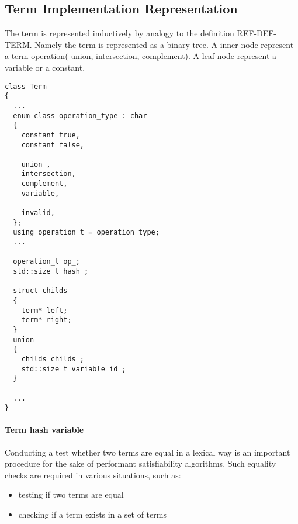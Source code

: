 \documentclass{article}
\begin{document}
	\subsection*{Term Implementation Representation}
	\label{sec:term-implementation-representation}
		The term is represented inductively by analogy to the definition REF-DEF-TERM. %
		Namely the term is represented as a binary tree. A inner node represent a term operation( union, intersection, complement). A leaf node represent a variable or a constant.
	\begin{lstlisting}
class Term 
{
  ...
  enum class operation_type : char
  {
    constant_true,
    constant_false,

    union_,
    intersection,
    complement,
    variable,

    invalid,
  };
  using operation_t = operation_type;
  ...

  operation_t op_;
  std::size_t hash_;
  
  struct childs
  {
    term* left;
    term* right;
  }
  union 
  {
    childs childs_;
    std::size_t variable_id_;
  }

  ...
}
	\end{lstlisting}

	\paragraph{Term hash variable} 
		Conducting a test whether two terms are equal in a lexical way is an important procedure for the sake of performant satisfiability algorithms.
		Such equality checks are required in various situations, such as:
		\begin{itemize}
			\item testing if two terms are equal
			\item checking if a term exists in a set of terms
		\end{itemize}
\end{document}
